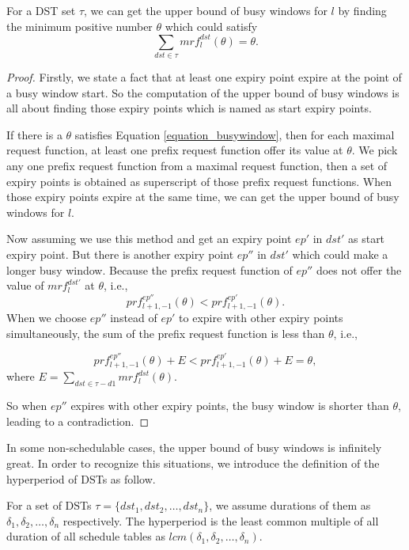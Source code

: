 \documentclass[sigconf]{acmart}
\begin{document}
\begin{lemma}
For a DST set $\tau$, we can get the upper bound of busy windows for $l$ by finding the minimum positive number $\theta$ which could satisfy
\begin{equation}
\sum\limits_{dst\in \tau}mrf^{dst}_l(\theta)=\theta.\label{equation_busywindow}
\end{equation}
\end{lemma}\label{lemma_busywindow}
\begin{proof}
Firstly, we state a fact that at least one expiry point expire at the point of a busy window start. So the computation of the upper bound of busy windows is all about finding those expiry points which is named as start expiry points.

If there is a $\theta$ satisfies Equation \ref{equation_busywindow}, then for each maximal request function, at least one prefix request function offer its value at $\theta$. We pick any one prefix request function from a maximal request function, then a set of expiry points is obtained as superscript of those prefix request functions. When those expiry points expire at the same time, we can get the upper bound of busy windows for $l$.

Now assuming we use this method and get an expiry point $ep'$ in $dst'$ as start expiry point. But there is another expiry point $ep''$ in $dst'$ which could make a longer busy window. Because the prefix request function of $ep''$ does not offer the value of $mrf^{dst'}_l$ at $\theta$, i.e.,
\[prf^{ep''}_{l+1,-1}(\theta)<prf^{ep'}_{l+1,-1}(\theta).\]
When we choose $ep''$ instead of $ep'$ to expire with other expiry points simultaneously, the sum of the prefix request function is less than $\theta$, i.e., 

\begin{equation}
prf^{ep''}_{l+1,-1}(\theta)+E<prf^{ep'}_{l+1,-1}(\theta)+E=\theta, 
\end{equation}
where $E=\sum\limits_{dst\in \tau-d1}mrf^{dst}_l(\theta)$.

So when $ep''$ expires with other expiry points, the busy window is shorter than $\theta$, leading to a contradiction.
\end{proof}

In some non-schedulable cases, the upper bound of busy windows is infinitely great. In order to recognize this situations, we introduce the definition of the hyperperiod of DSTs as follow.
\begin{definition}
For a set of DSTs $\tau=\{dst_1,dst_2,\dots,dst_n\}$, we assume durations of them as $\delta_1,\delta_2,\dots,\delta_n$ respectively. The hyperperiod is the least common multiple of all duration of all schedule tables as $lcm(\delta_1,\delta_2,\dots,\delta_n)$.
\end{definition}
\end{document}
